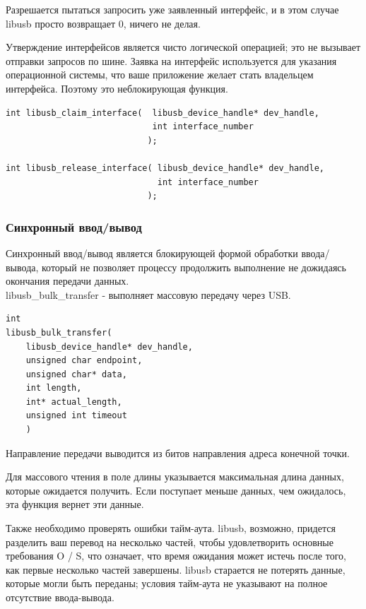\documentclass[14pt,a4paper]{article}
\begin{document}
\par Разрешается пытаться запросить уже заявленный интерфейс, и в этом случае libusb просто возвращает 0, ничего не делая.\\

\par Утверждение интерфейсов является чисто логической операцией; это не вызывает отправки запросов по шине. Заявка на интерфейс используется для указания операционной системы, что ваше приложение желает стать владельцем интерфейса. Поэтому это неблокирующая функция.

\begin{lstlisting}[language=c caption={}]
int libusb_claim_interface(  libusb_device_handle* dev_handle,
                             int interface_number
                            );
                            
int libusb_release_interface( libusb_device_handle* dev_handle,
                              int interface_number
                            );
\end{lstlisting}

\subsubsection{Синхронный ввод/вывод}
Синхронный ввод/вывод является блокирующей формой обработки ввода/вывода, который не позволяет процессу продолжить выполнение не дожидаясь окончания передачи данных.\\

libusb\_bulk\_transfer - выполняет массовую передачу через USB.

\begin{lstlisting}[language=c caption={}]
int
libusb_bulk_transfer(
    libusb_device_handle* dev_handle,
    unsigned char endpoint,
    unsigned char* data,
    int length,
    int* actual_length,
    unsigned int timeout
    )
\end{lstlisting}

\par Направление передачи выводится из битов направления адреса конечной точки. \\

\par Для массового чтения в поле длины указывается максимальная длина данных, которые ожидается получить. Если поступает меньше данных, чем ожидалось, эта функция вернет эти данные.\\

\par Также необходимо проверять ошибки тайм-аута. libusb, возможно, придется разделить ваш перевод на несколько частей, чтобы удовлетворить основные требования O / S, что означает, что время ожидания может истечь после того, как первые несколько частей завершены. libusb старается не потерять данные, которые могли быть переданы; условия тайм-аута не указывают на полное отсутствие ввода-вывода.
\end{document}
